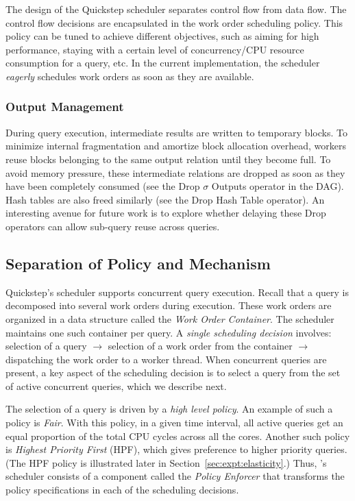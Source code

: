 The design of the Quickstep scheduler separates control flow from data flow.
The control flow decisions are encapsulated in the work order scheduling policy.
This policy can be tuned to achieve different objectives, such as aiming for high performance, staying with a certain level of concurrency/CPU resource consumption for a query, etc.
In the current implementation, the scheduler \textit{eagerly} schedules work orders as soon as they are available.

\subsubsection{Output Management}
During query execution, intermediate results are written to temporary blocks. To minimize internal fragmentation and amortize block allocation overhead, workers reuse blocks belonging to the same output relation until they become full. To avoid memory pressure, these intermediate relations are dropped as soon as they have been completely consumed (see the Drop $\sigma$ Outputs operator in the DAG). Hash tables are also freed similarly (see the Drop Hash Table operator). An interesting avenue for future work is to explore whether delaying these Drop operators can allow sub-query reuse across queries.

 \subsection{Separation of Policy and Mechanism} \label{sec:scheduler-policy-vs-mechanism}

Quickstep's scheduler supports concurrent query execution. Recall that a query is decomposed into several work orders during execution. These work orders are organized in a data structure called the \textit{Work Order Container}. The scheduler maintains one such container per query. A \textit{single scheduling decision} involves: selection of a query $\rightarrow$ selection of a work order from the container $\rightarrow$ dispatching the work order to a worker thread. When concurrent queries are present, a key aspect of the scheduling decision is to select a query from the set of active concurrent queries, which we describe next.

The selection of a query is driven by a \textit{high level policy}. An example of such a policy is \textit{Fair}. With this policy, in a given time interval, all active queries get an equal proportion of the total CPU cycles across all the cores. Another such policy is \textit{Highest Priority First} (HPF), which gives preference to higher priority queries. (The HPF policy is illustrated later in Section~\ref{sec:expt:elasticity}.) Thus, \Quickstep's scheduler consists of a component called the \textit{Policy Enforcer} that transforms the policy specifications in each of the scheduling decisions.

